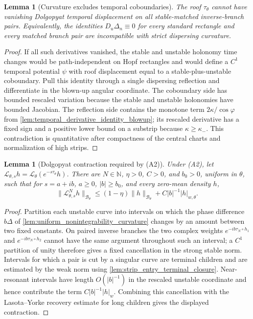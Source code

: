 \documentclass[12pt, letterpaper]{amsart}
\newcommand{\Bcal}{\mathcal{B}}
\theoremstyle{plain}
\newtheorem{lemma}[theorem]{Lemma}
\theoremstyle{definition}
\theoremstyle{remark}
\begin{document}
\begin{lemma}[Curvature excludes temporal coboundaries]
\label{lem:curvature_excludes_temporal_coboundary}
The roof $\tau_\theta$ cannot have vanishing Dolgopyat temporal displacement on
all stable-matched inverse-branch pairs.  Equivalently, the identities
$D_u\Delta_n\equiv0$ for every standard rectangle and every matched branch pair
are incompatible with strict dispersing curvature.
\end{lemma}

\begin{proof}
If all such derivatives vanished, the stable and unstable holonomy time changes
would be path-independent on Hopf rectangles and would define a $C^1$ temporal
potential $\psi$ with roof displacement equal to a stable-plus-unstable
coboundary.  Pull this identity through a single dispersing reflection and
differentiate in the blown-up angular coordinate.  The coboundary side has
bounded rescaled variation because the stable and unstable holonomies have
bounded Jacobian.  The reflection side contains the monotone term
$2\kappa/\cos\varphi$ from
\cref{lem:temporal_derivative_identity_blowup}; its rescaled derivative has a
fixed sign and a positive lower bound on a substrip because $\kappa\ge\kappa_-$.
This contradiction is quantitative after compactness of the central charts and
normalization of high strips.
\end{proof}

\begin{lemma}[Dolgopyat contraction required by \textup{(A2)}]
\label{lem:dolgopyat_contraction_deterministic}
Under \textup{(A2)}, let $\mathscr{L}_{\theta,s}h=\mathscr{L}_\theta(e^{-s\tau_\theta}h)$.  There are
$N\in\mathbb N$, $\eta>0$, $C>0$, and $b_0>0$, uniform in $\theta$, such that
for $s=a+ib$, $a\ge0$, $|b|\ge b_0$, and every zero-mean density $h$,
\begin{equation}
    \|\mathscr{L}_{\theta,s}^{N}h\|_{\Bcal_\theta}
    \le (1-\eta)\|h\|_{\Bcal_\theta}+C|b|^{-1}|h|_{w,\theta} .
\end{equation}
\end{lemma}

\begin{proof}
Partition each unstable curve into intervals on which the phase difference
$b\Delta$ of \cref{lem:uniform_nonintegrability_curvature} changes by an amount
between two fixed constants.  On paired inverse branches the two complex weights
$e^{-ib\tau_N\circ h_1}$ and $e^{-ib\tau_N\circ h_2}$ cannot have the same
argument throughout such an interval; a $C^1$ partition of unity therefore gives
a fixed cancellation in the strong stable norm.  Intervals for which a pair is
cut by a singular curve are terminal children and are estimated by the weak norm
using \cref{lem:strip_entry_terminal_closure}.  Near-resonant intervals have
length $O(|b|^{-1})$ in the rescaled unstable coordinate and hence contribute the
term $C|b|^{-1}|h|_w$.  Combining this cancellation with the Lasota--Yorke
recovery estimate for long children gives the displayed contraction.
\end{proof}
\end{document}

